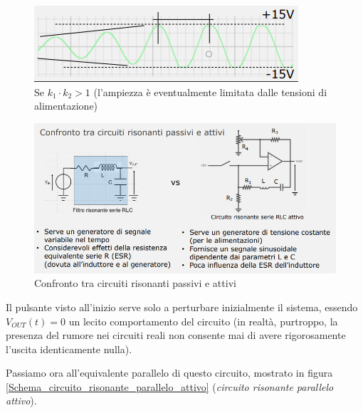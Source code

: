 \documentclass{article}
\begin{document}
\begin{figure}[h]
  \centering
  \includegraphics[scale=0.7]{IM_circuito_risonante_serie_attivo_grafico_2}
  \caption{Se $k_1 \cdot k_2 > 1$ (l'ampiezza è eventualmente limitata dalle tensioni di alimentazione)}
  \label{Schema_circuito_risonante_serie_attivo_grafico_2}
\end{figure}

\begin{figure}[h]
  \centering
  \includegraphics[scale=0.7]{IM_confronto_attivi_passivi}
  \caption{Confronto tra circuiti risonanti passivi e attivi}
  \label{Schema_confronto_attivi_passivi}
\end{figure}

Il pulsante visto all'inizio serve solo a perturbare inizialmente il sistema, essendo $V_{OUT} (t) = 0$ un lecito comportamento del circuito (in realtà, purtroppo, la presenza del rumore nei circuiti reali non consente mai di avere rigorosamente l'uscita identicamente nulla).

\clearpage

Passiamo ora all'equivalente parallelo di questo circuito, mostrato in figura \ref{Schema_circuito_risonante_parallelo_attivo} (\textit{circuito risonante parallelo attivo}).
\end{document}
